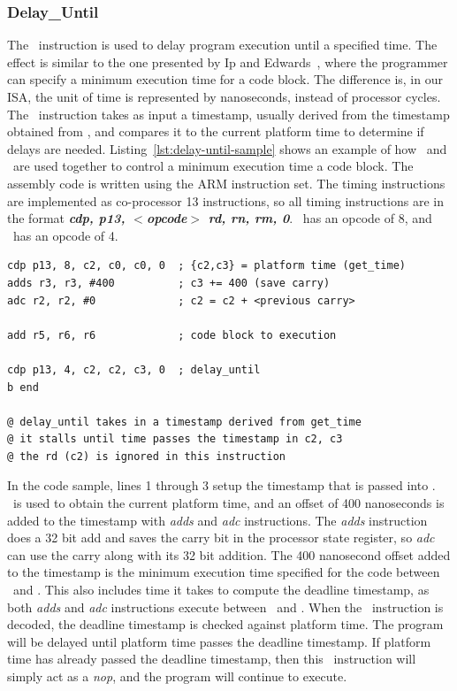 \subsubsection{Delay\_Until}
The \delayuntil\ instruction is used to delay program execution until a specified time.
The effect is similar to the one presented by Ip and Edwards~\cite{ip2006processor}, where the programmer can specify a minimum execution time for a code block.
The difference is, in our ISA, the unit of time is represented by nanoseconds, instead of processor cycles.
The \delayuntil\ instruction takes as input a timestamp, usually derived from the timestamp obtained from \gettime, and compares it to the current platform time to determine if delays are needed.
Listing~\ref{lst:delay-until-sample} shows an example of how \delayuntil\ and \gettime\ are used together to control a minimum execution time a code block.
The assembly code is written using the ARM instruction set.
The timing instructions are implemented as co-processor 13 instructions, so all timing instructions are in the format \textbf{\textit{cdp, p13, $<$opcode$>$ rd, rn, rm, 0}}.
\Gettime\ has an opcode of 8, and \delayuntil\ has an opcode of 4.
\vspace{-5mm}
\begin{lstlisting}[label=lst:delay-until-sample,caption=Sample assembly code of delay\_until ]
cdp p13, 8, c2, c0, c0, 0  ; {c2,c3} = platform time (get_time)
adds r3, r3, #400          ; c3 += 400 (save carry)
adc r2, r2, #0             ; c2 = c2 + <previous carry> 

add r5, r6, r6             ; code block to execution

cdp p13, 4, c2, c2, c3, 0  ; delay_until 
b end

@ delay_until takes in a timestamp derived from get_time
@ it stalls until time passes the timestamp in c2, c3
@ the rd (c2) is ignored in this instruction
\end{lstlisting}

In the code sample, lines 1 through 3 setup the timestamp that is passed into \delayuntil. 
\Gettime\ is used to obtain the current platform time, and an offset of 400 nanoseconds is added to the timestamp with \emph{adds} and \emph{adc} instructions.
The \emph{adds} instruction does a 32 bit add and saves the carry bit in the processor state register, so \emph{adc} can use the carry along with its 32 bit addition.
The 400 nanosecond offset added to the timestamp is the minimum execution time specified for the code between \gettime\ and \delayuntil.
This also includes time it takes to compute the deadline timestamp, as both \emph{adds} and \emph{adc} instructions execute between \gettime\ and \delayuntil.
When the \delayuntil\ instruction is decoded, the deadline timestamp is checked against platform time.
The program will be delayed until platform time passes the deadline timestamp. 
If platform time has already passed the deadline timestamp, then this \delayuntil\ instruction will simply act as a \emph{nop}, and the program will continue to execute. 

